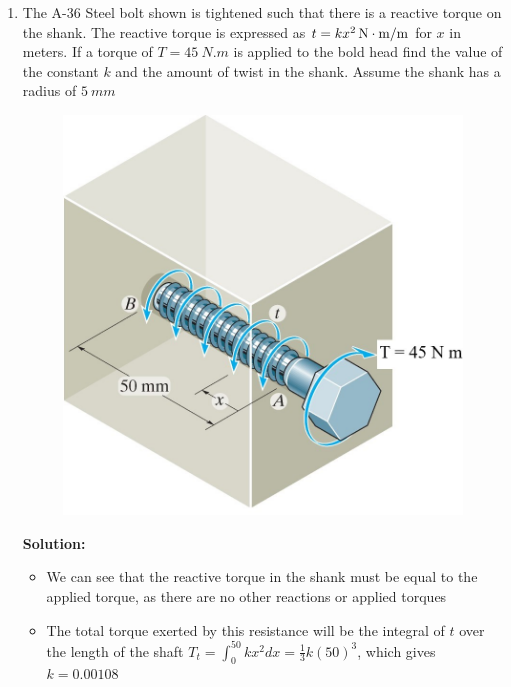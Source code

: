 \documentclass[12pt, oneside]{article}
\begin{document}
\begin{enumerate}
	\item %
		The A-36 Steel bolt shown is tightened such that there is a reactive torque on the shank.
		The reactive torque is expressed as $t = \SI[number-math-rm = \mathnormal, parse-numbers = false]{kx^2 }{N.m/m}$ for $x$ in meters.
		If a torque of $T=\SI{45 }{N.m}$ is applied to the bold head find the value of the constant $k$ and the amount of twist in the shank.
		Assume the shank has a radius of $\SI{5 }{mm}$
		\begin{figure}[H]
			\centering
			\includegraphics[width=0.6\linewidth]{5-69}
		\end{figure}
		\textbf{Solution:}
		\begin{itemize}
			\item We can see that the reactive torque in the shank must be equal to the applied torque, as there are no other reactions or applied torques
			\item The total torque exerted by this resistance will be the integral of $t$ over the length of the shaft $T_t = \int_0^{50} kx^2 dx = \frac{1}{3}k (50)^3$, which gives $k = 0.00108$
		\end{itemize}


\end{enumerate}
\end{document}
